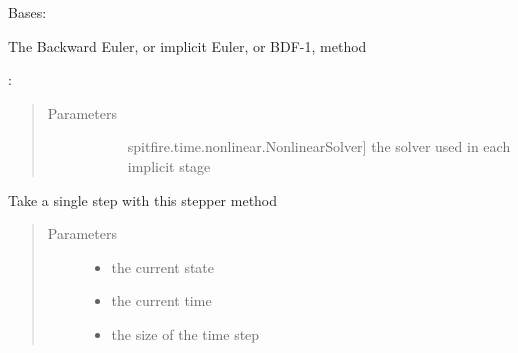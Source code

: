 \documentclass[letterpaper,10pt,english]{sphinxmanual}
\begin{document}
\begin{fulllineitems}
\label{\detokenize{spitfire.time.methods:spitfire.time.methods.BackwardEuler}}
Bases: {\hyperref[\detokenize{spitfire.time.methods:spitfire.time.methods.ImplicitTimeStepper}]{}}

The Backward Euler, or implicit Euler, or BDF-1, method

:
\begin{quote}\begin{description}
\item[{Parameters}] \leavevmode\begin{description}
\item[{}] \leavevmode{[}spitfire.time.nonlinear.NonlinearSolver{]}
the solver used in each implicit stage

\end{description}

\end{description}\end{quote}

\begin{fulllineitems}
\label{\detokenize{spitfire.time.methods:spitfire.time.methods.BackwardEuler.single_step}}
Take a single step with this stepper method
\begin{quote}\begin{description}
\item[{Parameters}] \leavevmode\begin{itemize}
\item {} 
 \textendash{} the current state

\item {} 
 \textendash{} the current time

\item {} 
 \textendash{} the size of the time step


\end{itemize}
\end{description}
\end{quote}
\end{fulllineitems}
\end{fulllineitems}
\end{document}

